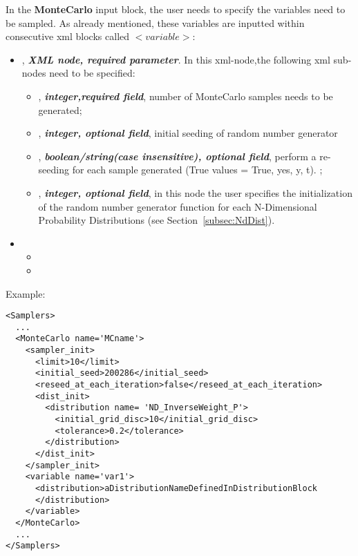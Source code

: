 In the \textbf{MonteCarlo} input block, the user needs to specify the variables need to be sampled. As already mentioned, these variables are inputted within consecutive xml blocks called $<variable>$:
\begin{itemize}
\item {},  \textit{\textbf{XML node, required parameter}}. In this xml-node,the following xml sub-nodes need to be specified:
  \begin{itemize}
    \item {}, \textit{\textbf{integer,required field}}, number of MonteCarlo samples needs to be generated;
    \item {}, \textit{\textbf{integer, optional field}}, initial seeding of random number generator
    \item {},  \textit{\textbf{boolean/string(case insensitive), optional field}}, perform a re-seeding for each sample generated (True values = True, yes, y, t). ;
    \item {},  \textit{\textbf{integer, optional field}}, in this node the user specifies the initialization of the random number generator function for each N-Dimensional Probability Distributions (see Section~\ref{subsec:NdDist}).
  \end{itemize}
\end{itemize}
\begin{itemize}
\item \variableDescription
 \variableChildrenIntro
 \begin{itemize}
    \item \distributionDescription
    \item \functionDescription
  \end{itemize}
\end{itemize}


Example:
\begin{lstlisting}[style=XML]
<Samplers>
  ...
  <MonteCarlo name='MCname'>
    <sampler_init>
      <limit>10</limit>
      <initial_seed>200286</initial_seed>
      <reseed_at_each_iteration>false</reseed_at_each_iteration>
      <dist_init>
        <distribution name= 'ND_InverseWeight_P'>
          <initial_grid_disc>10</initial_grid_disc>
          <tolerance>0.2</tolerance>
        </distribution>
      </dist_init>
    </sampler_init>
    <variable name='var1'>
      <distribution>aDistributionNameDefinedInDistributionBlock
      </distribution>
    </variable>
  </MonteCarlo>
  ...
</Samplers>
\end{lstlisting}

